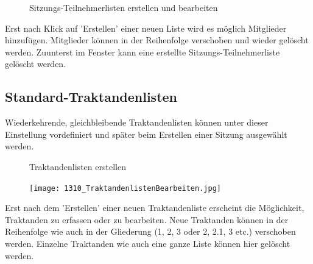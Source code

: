 \begin{figure}[H]
\end{figure}

\begin{figure}[H]
\vspace{-25pt}
\caption{Sitzungs-Teilnehmerlisten erstellen und bearbeiten}
\end{figure}

Erst nach Klick auf 'Erstellen' einer neuen Liste wird es möglich Mitglieder hinzufügen. Mitglieder können in der Reihenfolge verschoben und wieder gelöscht werden. Zuunterst im Fenster kann eine erstellte Sitzungs-Teilnehmerliste gelöscht werden.

\clearpage
\subsection{Standard-Traktandenlisten}

Wiederkehrende, gleichbleibende Traktandenlisten können unter dieser Einstellung vordefiniert und später beim Erstellen einer Sitzung ausgewählt werden.

\begin{figure}[H]
\caption{Traktandenlisten erstellen}
\end{figure}

\begin{figure}
\vspace{-15pt}
\texttt{[image: 1310\_TraktandenlistenBearbeiten.jpg]}
\end{figure}

Erst nach dem 'Erstellen' einer neuen Traktandenliste erscheint die Möglichkeit, Traktanden zu erfassen oder zu bearbeiten. Neue Traktanden können in der Reihenfolge wie auch in der Gliederung (1, 2, 3 oder 2, 2.1, 3 etc.) verschoben werden. Einzelne Traktanden wie auch eine ganze Liste können hier gelöscht werden.
